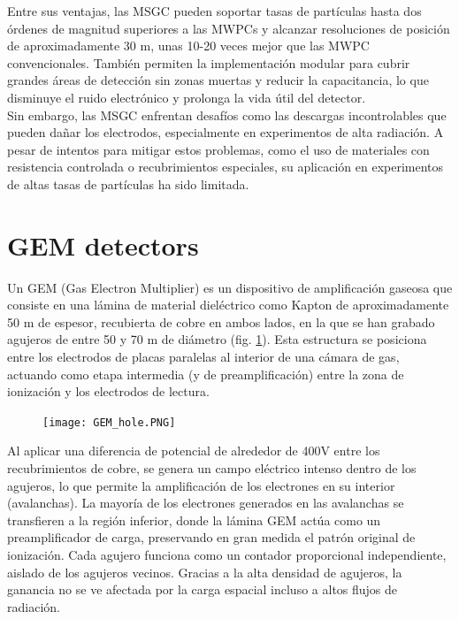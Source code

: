 \documentclass[]{book}
\begin{document}
\noindent Entre sus ventajas, las MSGC pueden soportar tasas de partículas hasta dos órdenes de magnitud superiores a las MWPCs y alcanzar resoluciones de posición de aproximadamente 30 \textmu m, unas 10-20 veces mejor que las MWPC convencionales. También permiten la implementación modular para cubrir grandes áreas de detección sin zonas muertas y reducir la capacitancia, lo que disminuye el ruido electrónico y prolonga la vida útil del detector.\\

\noindent Sin embargo, las MSGC enfrentan desafíos como las descargas incontrolables que pueden dañar los electrodos, especialmente en experimentos de alta radiación. A pesar de intentos para mitigar estos problemas, como el uso de materiales con resistencia controlada o recubrimientos especiales, su aplicación en experimentos de altas tasas de partículas ha sido limitada.\\


\section{GEM detectors}

\noindent Un GEM (Gas Electron Multiplier) es un dispositivo de amplificación gaseosa que consiste en una lámina de material dieléctrico como Kapton de aproximadamente 50 \textmu m de espesor, recubierta de cobre en ambos lados, en la que se han grabado agujeros de entre 50 y 70 \textmu m de diámetro (fig. \ref{fig:gem_hole}). Esta estructura se posiciona entre los electrodos de placas paralelas al interior de una cámara de gas, actuando como etapa intermedia (y de preamplificación) entre la zona de ionización y los electrodos de lectura.

\begin{figure}[H]
    \centering
    \texttt{[image: GEM\_hole.PNG]}
    \caption{}
    \label{fig:gem_hole}
\end{figure}
\noindent Al aplicar una diferencia de potencial de alrededor de 400V entre los recubrimientos de cobre, se genera un campo eléctrico intenso dentro de los agujeros, lo que permite la amplificación de los electrones en su interior (avalanchas). La mayoría de los electrones generados en las avalanchas se transfieren a la región inferior, donde la lámina GEM actúa como un preamplificador de carga, preservando en gran medida el patrón original de ionización. Cada agujero funciona como un contador proporcional independiente, aislado de los agujeros vecinos. Gracias a la alta densidad de agujeros, la ganancia no se ve afectada por la carga espacial incluso a altos flujos de radiación.\\ 
\end{document}
